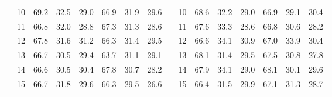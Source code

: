 \begin{table}[p]
{\begin{tabular}{c c | c c c | c c c || c c | c c c | c c c}
             & 10 & 69.2 & 32.5 & 29.0 & 66.9 & 31.9 & 29.6 &  & 10 & 68.6 & 32.2 & 29.0 & 66.9 & 29.1 & 30.4 \\
             & 11 & 66.8 & 32.0 & 28.8 & 67.3 & 31.3 & 28.6 &  & 11 & 67.6 & 33.3 & 28.6 & 66.8 & 30.6 & 28.2 \\
             & 12 & 67.8 & 31.6 & 31.2 & 66.3 & 31.4 & 29.5 &  & 12 & 66.6 & 34.1 & 30.9 & 67.0 & 33.9 & 30.4 \\
             & 13 & 66.7 & 30.5 & 29.4 & 63.7 & 31.1 & 29.1 &  & 13 & 68.1 & 31.4 & 29.5 & 67.5 & 30.8 & 27.8 \\
             & 14 & 66.6 & 30.5 & 30.4 & 67.8 & 30.7 & 28.2 &  & 14 & 67.9 & 34.1 & 29.0 & 68.1 & 30.1 & 29.6 \\
             & 15 & 66.7 & 31.8 & 29.6 & 66.3 & 29.5 & 26.6 &  & 15 & 66.4 & 31.5 & 29.9 & 67.1 & 31.3 & 28.7 \\
    \bottomrule
\end{tabular}%
}
\label{tab:duration_distal_group}
\end{table}

